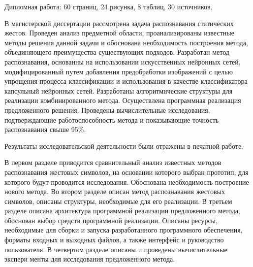 \Referat
Дипломная работа: 60 страниц, 24 рисунка, 8 таблиц, 30 источников.

В магистерской диссертации рассмотрена задача распознавания статических жестов. Проведен анализ предметной области, проанализированы известные методы решения данной задачи и обоснована необходимость построения метода, объединяющего преимущества существующих подходов. Разработан метод распознавания, основанны на использовании искусственных нейронных сетей, модифицированный путем добавления предобработки изображений с целью упрощения процесса классификации и использования в качестве классификатора капсульный нейронных сетей. Разработаны алгоритмические структуры для реализации комбинированного метода. Осуществлена программная реализация предложенного решения. Прове­дены вычислительные исследования, подтверждающие работоспособ­ность метода и показывающие точность распознавания свыше 95\%.

Результаты исследовательской деятельности были отражены в печатной работе.

В первом разделе приводится сравнительный анализ известных методов распознавания жестовых символов, на основании которого выбран прототип, для которого будут проводится исследования. Обоснована необходимость построение нового метода. Во втором разделе описан метод распознавания жестовых символов, описаны структуры, необходимые для его реализации. В третьем разделе описана архитектура программной реализации предложенного метода, обоснован выбор средств программной реализации. Описаны ресурсы, необходимые для сборки и запуска разработанного программного обеспечения, форматы входных и выходных файлов, а также интерфейс и руководство пользователя. В четвертом разделе описаны и проведены вычислительные экспери­ менты для исследования предложенного метода.


